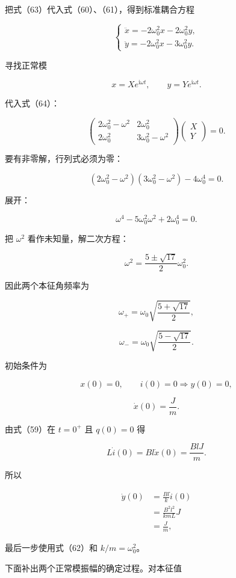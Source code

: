 \documentclass[12pt,a4paper,UTF8]{ctexart}
\begin{document}
把式（63）代入式（60）、（61），得到标准耦合方程

\[\boxed{
\begin{cases}
\ddot x=-2\omega_0^2x-2\omega_0^2y,\\
\ddot y=-2\omega_0^2x-3\omega_0^2y.
\end{cases}}
\tag{64}\]

寻找正常模

\[x=Xe^{\mathrm i\omega t},\qquad
y=Ye^{\mathrm i\omega t}.\]

代入式（64）：

\[\begin{pmatrix}
2\omega_0^2-\omega^2&2\omega_0^2\\
2\omega_0^2&3\omega_0^2-\omega^2
\end{pmatrix}
\begin{pmatrix}X\\Y\end{pmatrix}=0.\]

要有非零解，行列式必须为零：

\[\left(2\omega_0^2-\omega^2\right)
\left(3\omega_0^2-\omega^2\right)-4\omega_0^4=0.\]

展开：

\[\omega^4-5\omega_0^2\omega^2+2\omega_0^4=0. \tag{65}\]

把 \(\omega^2\) 看作未知量，解二次方程：

\[\omega^2=\frac{5\pm\sqrt{17}}{2}\omega_0^2.\]

因此两个本征角频率为

\[\omega_+=\omega_0\sqrt{\frac{5+\sqrt{17}}2},\]

\[\omega_-=\omega_0\sqrt{\frac{5-\sqrt{17}}2}. \tag{66}\]

初始条件为

\[x(0)=0,\qquad i(0)=0\Rightarrow y(0)=0,\]

\[\dot x(0)=\frac Jm.\]

由式（59）在 \(t=0^+\) 且 \(q(0)=0\) 得

\[L\dot i(0)=Bl\dot x(0)=\frac{BlJ}{m}.\]

所以

\[\begin{aligned}
\dot y(0)
&=\frac{Bl}{k}\dot i(0)\\
&=\frac{B^2l^2}{kmL}J\\
&=\frac Jm,
\end{aligned} \tag{67}\]

最后一步使用式（62）和 \(k/m=\omega_0^2\)。

下面补出两个正常模振幅的确定过程。对本征值
\end{document}
